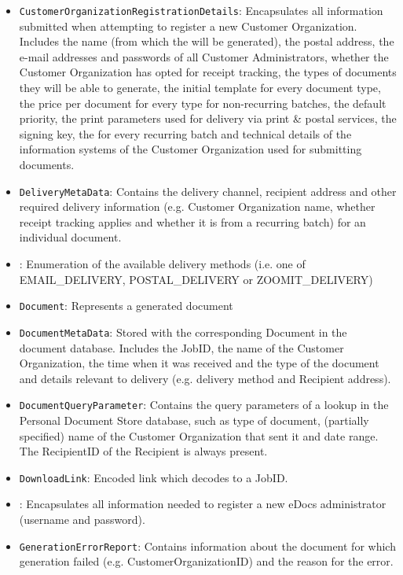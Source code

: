 \begin{itemize}
	\item \texttt{CustomerOrganizationRegistrationDetails}: Encapsulates all information submitted when attempting to register a new Customer Organization. Includes the name (from which the  will be generated), the postal address, the e-mail addresses and passwords of all Customer Administrators, whether the Customer Organization has opted for receipt tracking, the types of documents they will be able to generate, the initial template for every document type, the price per document for every type for non-recurring batches, the default priority, the print parameters used for delivery via print \& postal services, the signing key, the  for every recurring batch and technical details of the information systems of the Customer Organization used for submitting documents.
	\item \texttt{DeliveryMetaData}: Contains the delivery channel, recipient address and other required delivery information (e.g. Customer Organization name, whether receipt tracking applies and whether it is from a recurring batch) for an individual document.
	\item {}: Enumeration of the available delivery methods (i.e. one of EMAIL\_DELIVERY, POSTAL\_DELIVERY or ZOOMIT\_DELIVERY)
	\item \texttt{Document}: Represents a generated document
	\item \texttt{DocumentMetaData}: Stored with the corresponding Document in the document database. Includes the JobID, the name of the Customer Organization, the time when it was received and the type of the document and details relevant to delivery (e.g. delivery method and Recipient address).
	\item \texttt{DocumentQueryParameter}: Contains the query parameters of a lookup in the Personal Document Store database, such as type of document, (partially specified) name of the Customer Organization that sent it and date range. The RecipientID of the Recipient is always present.
	\item \texttt{DownloadLink}: Encoded link which decodes to a JobID.
	\item {}: Encapsulates all information needed to register a new eDocs administrator (username and password).
	\item \texttt{GenerationErrorReport}: Contains information about the document for which generation failed (e.g. CustomerOrganizationID) and the reason for the error.

\end{itemize}
